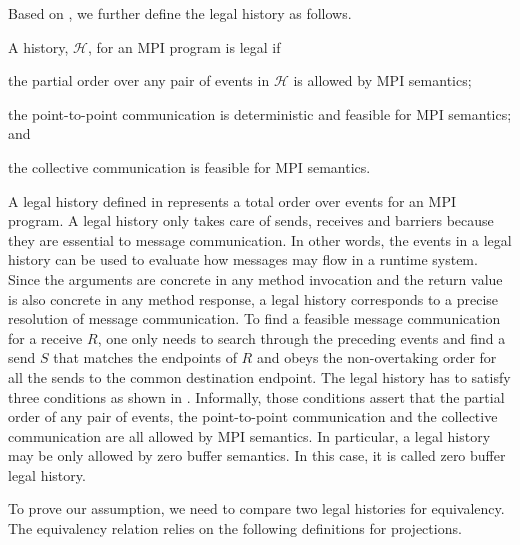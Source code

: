 Based on , we further define the legal history as follows.

\begin{definition}\label{def:legal}
A history, $\mathcal{H}$, for an MPI program is legal if
\begin{compactenum}
\item the partial order over any pair of events in $\mathcal{H}$ is allowed by MPI semantics; 
\item the point-to-point communication is deterministic and feasible for MPI semantics; and
\item the collective communication is feasible for MPI semantics.
\end{compactenum}
\end{definition}

A legal history defined in  represents a total order over events for an MPI program. A legal history only takes care of sends, receives and barriers because they are essential to message communication. In other words, the events in a legal history can be used to evaluate how messages may flow in a runtime system. Since the arguments are concrete in any method invocation and the return value is also concrete in any method response, a legal history corresponds to a precise resolution of message communication. To find a feasible message communication for a receive $R$, one only needs to search through the preceding events and find a send $S$ that matches the endpoints of $R$ and obeys the non-overtaking order for all the sends to the common destination endpoint. The legal history has to satisfy three conditions as shown in . Informally, those conditions assert that the partial order of any pair of events, the point-to-point communication and the collective communication are all allowed by MPI semantics. In particular, a legal history may be only allowed by zero buffer semantics. In this case, it is called zero buffer legal history.

To prove our assumption, we need to compare two legal histories for equivalency. The equivalency relation relies on the following definitions for projections. 


